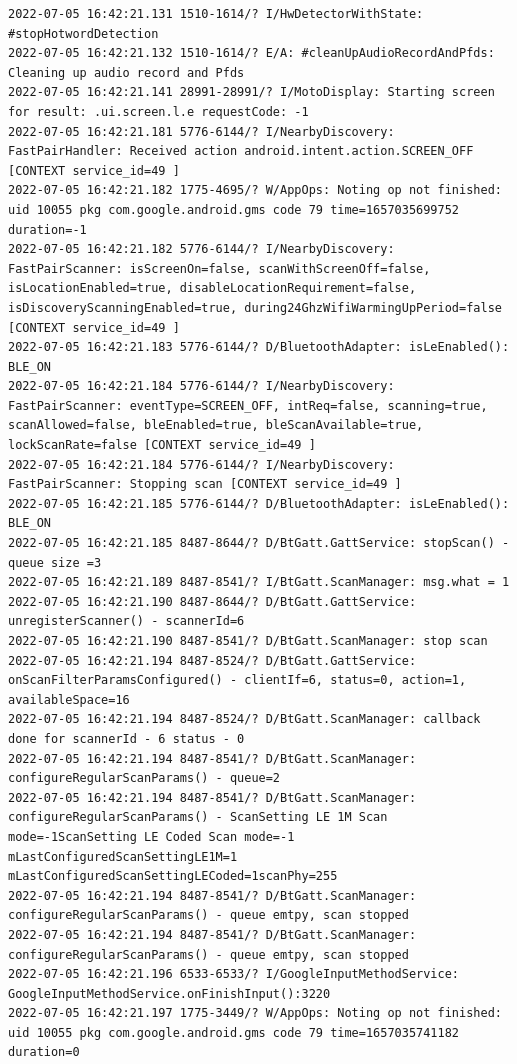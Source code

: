 \documentclass[a4paper,12pt]{book}
\begin{document}
\begin{lstlisting}
2022-07-05 16:42:21.131 1510-1614/? I/HwDetectorWithState: #stopHotwordDetection
2022-07-05 16:42:21.132 1510-1614/? E/A: #cleanUpAudioRecordAndPfds: Cleaning up audio record and Pfds
2022-07-05 16:42:21.141 28991-28991/? I/MotoDisplay: Starting screen for result: .ui.screen.l.e requestCode: -1
2022-07-05 16:42:21.181 5776-6144/? I/NearbyDiscovery: FastPairHandler: Received action android.intent.action.SCREEN_OFF [CONTEXT service_id=49 ]
2022-07-05 16:42:21.182 1775-4695/? W/AppOps: Noting op not finished: uid 10055 pkg com.google.android.gms code 79 time=1657035699752 duration=-1
2022-07-05 16:42:21.182 5776-6144/? I/NearbyDiscovery: FastPairScanner: isScreenOn=false, scanWithScreenOff=false, isLocationEnabled=true, disableLocationRequirement=false, isDiscoveryScanningEnabled=true, during24GhzWifiWarmingUpPeriod=false [CONTEXT service_id=49 ]
2022-07-05 16:42:21.183 5776-6144/? D/BluetoothAdapter: isLeEnabled(): BLE_ON
2022-07-05 16:42:21.184 5776-6144/? I/NearbyDiscovery: FastPairScanner: eventType=SCREEN_OFF, intReq=false, scanning=true, scanAllowed=false, bleEnabled=true, bleScanAvailable=true, lockScanRate=false [CONTEXT service_id=49 ]
2022-07-05 16:42:21.184 5776-6144/? I/NearbyDiscovery: FastPairScanner: Stopping scan [CONTEXT service_id=49 ]
2022-07-05 16:42:21.185 5776-6144/? D/BluetoothAdapter: isLeEnabled(): BLE_ON
2022-07-05 16:42:21.185 8487-8644/? D/BtGatt.GattService: stopScan() - queue size =3
2022-07-05 16:42:21.189 8487-8541/? I/BtGatt.ScanManager: msg.what = 1
2022-07-05 16:42:21.190 8487-8644/? D/BtGatt.GattService: unregisterScanner() - scannerId=6
2022-07-05 16:42:21.190 8487-8541/? D/BtGatt.ScanManager: stop scan
2022-07-05 16:42:21.194 8487-8524/? D/BtGatt.GattService: onScanFilterParamsConfigured() - clientIf=6, status=0, action=1, availableSpace=16
2022-07-05 16:42:21.194 8487-8524/? D/BtGatt.ScanManager: callback done for scannerId - 6 status - 0
2022-07-05 16:42:21.194 8487-8541/? D/BtGatt.ScanManager: configureRegularScanParams() - queue=2
2022-07-05 16:42:21.194 8487-8541/? D/BtGatt.ScanManager: configureRegularScanParams() - ScanSetting LE 1M Scan mode=-1ScanSetting LE Coded Scan mode=-1 mLastConfiguredScanSettingLE1M=1 mLastConfiguredScanSettingLECoded=1scanPhy=255
2022-07-05 16:42:21.194 8487-8541/? D/BtGatt.ScanManager: configureRegularScanParams() - queue emtpy, scan stopped
2022-07-05 16:42:21.194 8487-8541/? D/BtGatt.ScanManager: configureRegularScanParams() - queue emtpy, scan stopped
2022-07-05 16:42:21.196 6533-6533/? I/GoogleInputMethodService: GoogleInputMethodService.onFinishInput():3220 
2022-07-05 16:42:21.197 1775-3449/? W/AppOps: Noting op not finished: uid 10055 pkg com.google.android.gms code 79 time=1657035741182 duration=0

\end{lstlisting}
\end{document}
